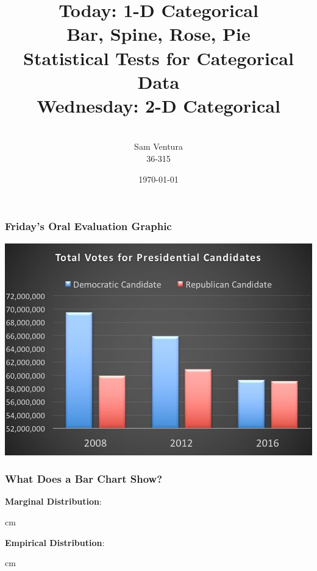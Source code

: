 \documentclass{beamer} %
\begin{document}
\title[dedup]{Today:  1-D Categorical \\ Bar, Spine, Rose, Pie \\ Statistical Tests for Categorical Data \\ Wednesday:  2-D Categorical}


\author[Samuel L. Ventura]{\\
  \large{Sam Ventura\\36-315}}
\date{\today}


\begin{frame}
	\maketitle
	
\end{frame}


\begin{frame}\frametitle{Friday's Oral Evaluation Graphic}
	\small
	
	\includegraphics[width = \linewidth]{votes.jpg}
	
\end{frame}



\begin{frame}\frametitle{What Does a Bar Chart Show?}
	\small
	
	\textbf{Marginal Distribution}:  %
	
	 cm
	
	\textbf{Empirical Distribution}:  %
	
	
	
	 cm
	
\end{frame}
\end{document}
